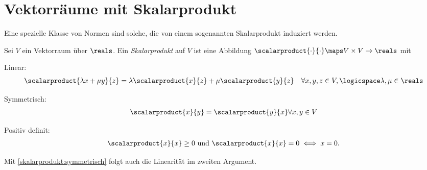 \section*{Vektorräume mit Skalarprodukt}
Eine spezielle Klasse von Normen sind solche, die von einem sogenannten Skalarprodukt induziert werden.
\begin{definition}
    Sei \( V \) ein Vektorraum über \( \reals \).
    Ein \emph{Skalarprodukt} auf \( V \) ist eine Abbildung \( \scalarproduct{\cdot}{\cdot}\maps V\times V\to \reals \) mit
    \begin{eigenschaftenenumerate}
        \item \label{skalarprodukt:linear}Linear: \begin{align*}
            \scalarproduct{\lambda x+\mu y}{z}=\lambda\scalarproduct{x}{z}+\mu\scalarproduct{y}{z}\quad \forall x,y,z\in V,\logicspace \lambda,\mu\in \reals
        \end{align*}
        \item \label{skalarprodukt:symmetrisch}Symmetrisch: \begin{align*}
            \scalarproduct{x}{y}=\scalarproduct{y}{x} \forall x,y\in V
        \end{align*}
        \item \label{skalarprodukt:positiv_definit}Positiv definit: \begin{align*}
            \scalarproduct{x}{x}\geq 0 \text{ und } \scalarproduct{x}{x}=0\iff x=0. 
        \end{align*}
    \end{eigenschaftenenumerate}
    
\end{definition}
\begin{bemerkung*}
    Mit \ref{skalarprodukt:symmetrisch} folgt auch die Linearität im zweiten Argument.
\end{bemerkung*}
